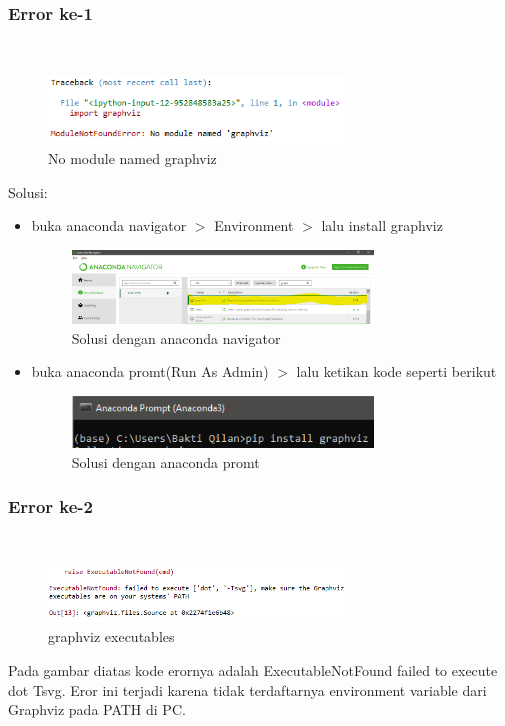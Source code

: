 \subsubsection{Error ke-1}
\hfill\\
\begin{figure}[H]
    \includegraphics[width=8cm]{figures/1174083/figures2/error1.png}
    \centering
    \caption{No module named graphviz}
\end{figure}
Solusi: 
	\begin{itemize}
	\item buka anaconda navigator $>$ Environment $>$  lalu install graphviz
	\begin{figure}[H]
    	\includegraphics[width=8cm]{figures/1174083/figures2/s1.png}
    	\centering
    	\caption{Solusi dengan anaconda navigator}
	\end{figure}
	\item buka anaconda promt(Run As Admin) $>$ lalu ketikan kode seperti berikut
	\begin{figure}[H]
    	\includegraphics[width=8cm]{figures/1174083/figures2/s1.1.png}
    	\centering
    	\caption{Solusi dengan anaconda promt}
	\end{figure}
	\end{itemize}
	
\subsubsection{Error ke-2}
\hfill\\
\begin{figure}[H]
    \includegraphics[width=8cm]{figures/1174083/figures2/error2.png}
    \centering
    \caption{graphviz executables}
\end{figure}
Pada gambar diatas kode erornya adalah ExecutableNotFound failed to execute dot Tsvg. Eror ini terjadi karena tidak terdaftarnya environment variable dari Graphviz pada PATH di PC.

